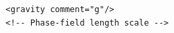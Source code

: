 \documentclass{article}
\begin{document}
\begin{lstlisting}[style=xmlstyle]
<gravity comment="g"/>
<!-- Phase-field length scale -->
\end{lstlisting}
\end{document}

